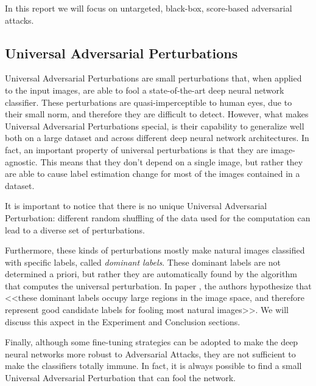 

In this report we will focus on untargeted, black-box, score-based adversarial attacks.

\subsection{Universal Adversarial Perturbations}
\label{section:perturb}
Universal Adversarial Perturbations are small perturbations that, when applied to the input images, are able
to fool a state-of-the-art deep neural network classifier. These perturbations are quasi-imperceptible to human eyes,
due to their small norm, and therefore they are difficult to detect. However, what makes Universal Adversarial Perturbations special,
is their capability to generalize well both on a large dataset and across different deep neural network architectures.
In fact, an important property of universal perturbations is that they are image-agnostic. This means that
they don't depend on a single image, but rather they are able to cause label estimation change for most of
the images contained in a dataset.

It is important to notice that there is no unique Universal Adversarial Perturbation: different random shuffling of the data used
for the computation can lead to a diverse set of perturbations.

Furthermore, these kinds of perturbations mostly make natural images classified with specific labels, called
\textit{dominant labels}. These dominant labels are not determined a priori, but rather they are automatically
found by the algorithm that computes the universal perturbation. In paper \cite{A2}, the authors
hypothesize that <<these dominant labels occupy large regions in the image space, and therefore represent good
candidate labels for fooling most natural images>>. We will discuss this axpect in the Experiment and Conclusion sections.

Finally, although some fine-tuning strategies can be adopted to make the deep neural networks more robust to Adversarial
Attacks, they are not sufficient to make the classifiers totally immune. In fact, it is always
possible to find a small Universal Adversarial Perturbation that can fool the network.




